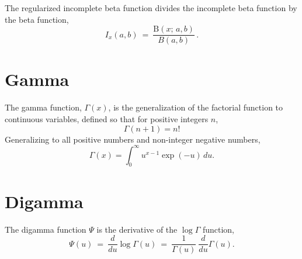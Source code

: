 The regularized incomplete beta function divides the incomplete beta
function by the beta function,
\[
I_x(a, b) \ = \ \frac{\mathrm{B}(x; \, a, b)}{B(a, b)} \, .
\]




\section{Gamma}\label{gamma-appendix.section}

The gamma function, $\Gamma(x)$, is the generalization of the
factorial function to continuous variables, defined so that for
positive integers $n$,
\[
\Gamma(n+1) = n!
\]
%
Generalizing to all positive numbers and non-integer negative numbers,
\[
\Gamma(x) = \int_0^{\infty} u^{x - 1} \exp(-u) \, du.
\]


\section{Digamma}\label{digamma-appendix.section}

The digamma function $\Psi$ is the derivative of the $\log \Gamma$
function,
%
\[
\Psi(u) 
\ = \
\frac{d}{d u} \log \Gamma(u) 
\ = \
\frac{1}{\Gamma(u)} \ \frac{d}{d u} \Gamma(u).
\]
